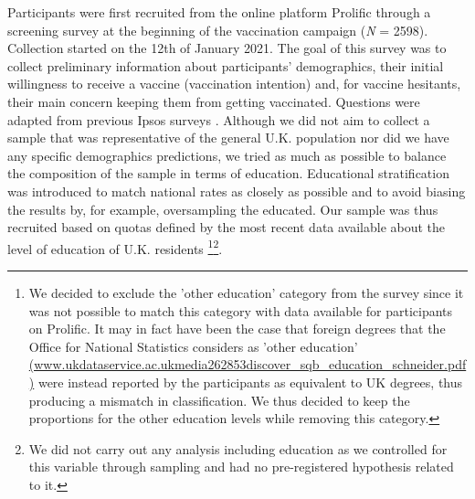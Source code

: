 \documentclass[authordate, empirical]{jote-new-article}
\begin{document}
	Participants were first recruited from the online platform Prolific through a screening survey at the beginning of the vaccination campaign (\emph{N }= 2598). Collection started on the 12th of January 2021. The goal of this survey was to collect preliminary information about participants' demographics, their initial willingness to receive a vaccine (vaccination intention) and, for vaccine hesitants, their main concern keeping them from getting vaccinated. Questions were adapted from previous Ipsos surveys \parencites{Boyon2021}. Although we did not aim to collect a sample that was representative of the general U.K. population nor did we have any specific demographics predictions, we tried as much as possible to balance the composition of the sample in terms of education. Educational stratification was introduced to match national rates as closely as possible and to avoid biasing the results by, for example, oversampling the educated. Our sample was thus recruited based on quotas defined by the most recent data available about the level of education of U.K. residents \parencites[yOffice for][]{forNationalStatistics2019}\footnote{ We decided to exclude the 'other education' category from the survey since it was not possible to match this category with data available for participants on Prolific. It may in fact have been the case that foreign degrees that the Office for National Statistics considers as 'other education' \href{https://www.ukdataservice.ac.uk/media/262853/discover_sqb_education_schneider.pdf}{(www.ukdataservice.ac.ukmedia262853discover\_sqb\_education\_schneider.pdf)} were instead reported by the participants as equivalent to UK degrees, thus producing a mismatch in classification. We thus decided to keep the proportions for the other education levels while removing this category.}\footnote{ We did not carry out any analysis including education as we controlled for this variable through sampling and had no pre-registered hypothesis related to it.}.
\end{document}
